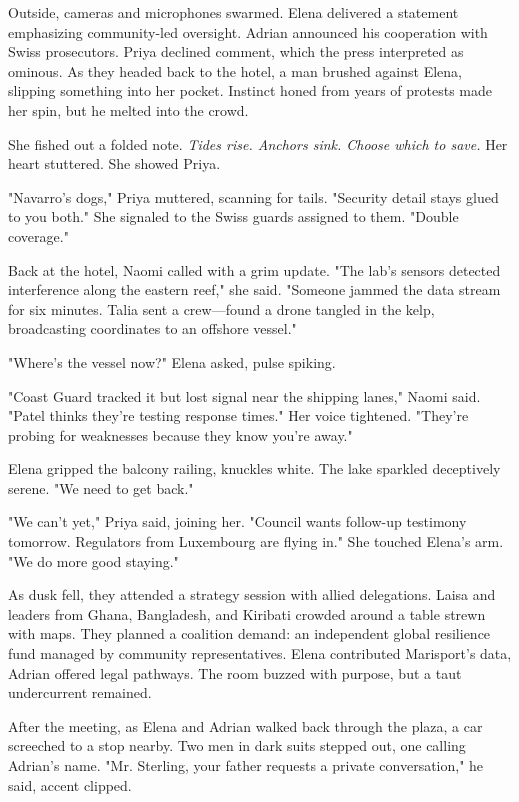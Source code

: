 Outside, cameras and microphones swarmed. Elena delivered a statement emphasizing community-led oversight. Adrian announced his cooperation with Swiss prosecutors. Priya declined comment, which the press interpreted as ominous. As they headed back to the hotel, a man brushed against Elena, slipping something into her pocket. Instinct honed from years of protests made her spin, but he melted into the crowd.

She fished out a folded note. \textit{Tides rise. Anchors sink. Choose which to save.} Her heart stuttered. She showed Priya.

"Navarro's dogs," Priya muttered, scanning for tails. "Security detail stays glued to you both." She signaled to the Swiss guards assigned to them. "Double coverage."

Back at the hotel, Naomi called with a grim update. "The lab's sensors detected interference along the eastern reef," she said. "Someone jammed the data stream for six minutes. Talia sent a crew—found a drone tangled in the kelp, broadcasting coordinates to an offshore vessel."

"Where's the vessel now?" Elena asked, pulse spiking.

"Coast Guard tracked it but lost signal near the shipping lanes," Naomi said. "Patel thinks they're testing response times." Her voice tightened. "They're probing for weaknesses because they know you're away."

Elena gripped the balcony railing, knuckles white. The lake sparkled deceptively serene. "We need to get back."

"We can't yet," Priya said, joining her. "Council wants follow-up testimony tomorrow. Regulators from Luxembourg are flying in." She touched Elena's arm. "We do more good staying."

As dusk fell, they attended a strategy session with allied delegations. Laisa and leaders from Ghana, Bangladesh, and Kiribati crowded around a table strewn with maps. They planned a coalition demand: an independent global resilience fund managed by community representatives. Elena contributed Marisport's data, Adrian offered legal pathways. The room buzzed with purpose, but a taut undercurrent remained.

After the meeting, as Elena and Adrian walked back through the plaza, a car screeched to a stop nearby. Two men in dark suits stepped out, one calling Adrian's name. "Mr. Sterling, your father requests a private conversation," he said, accent clipped.

